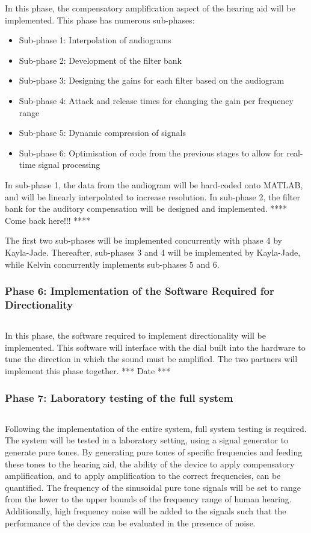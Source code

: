 \documentclass[10pt,twocolumn]{witseiepaper}
\begin{document}
In this phase, the compensatory amplification aspect of the hearing aid will be implemented. This phase has numerous sub-phases:
\begin{itemize}
	\item Sub-phase 1: Interpolation of audiograms 
	\item Sub-phase 2: Development of the filter bank
	\item Sub-phase 3: Designing the gains for each filter based on the audiogram
	\item Sub-phase 4: Attack and release times for changing the gain per frequency range 
	\item Sub-phase 5: Dynamic compression of signals
	\item Sub-phase 6: Optimisation of code from the previous stages to allow for real-time signal processing
\end{itemize}

In sub-phase 1, the data from the audiogram will be hard-coded onto MATLAB, and will be linearly interpolated to increase resolution. In sub-phase 2, the filter bank for the auditory compensation will be designed and implemented. 
**** Come back here!!! ****

The first two sub-phases will be implemented concurrently with phase 4 by Kayla-Jade. Thereafter, sub-phases 3 and 4 will be implemented by Kayla-Jade, while Kelvin concurrently implements sub-phases 5 and 6.


\subsubsection*{Phase 6: Implementation of the Software Required for Directionality} $    $

In this phase, the software required to implement directionality will be implemented. This software will interface with the dial built into the hardware to tune the direction in which the sound must be amplified. The two partners will implement this phase together. 
*** Date ***

\subsubsection*{Phase 7: Laboratory testing of the full system} $    $

Following the implementation of the entire system, full system testing is required. The system will be tested in a laboratory setting, using a signal generator to generate pure tones. By generating pure tones of specific frequencies and feeding these tones to the hearing aid, the ability of the device to apply compensatory amplification, and to apply amplification to the correct frequencies, can be quantified. The frequency of the sinusoidal pure tone signals will be set to range from the lower to the upper bounds of the frequency range of human hearing. Additionally, high frequency noise will be added to the signals such that the performance of the device can be evaluated in the presence of noise.
\end{document}
